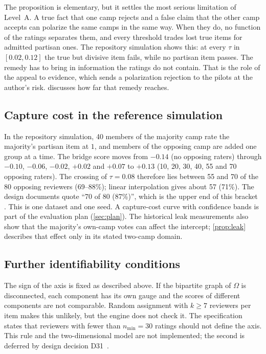 The proposition is elementary, but it settles the most serious limitation of Level~A. A true
fact that one camp rejects and a false claim that the other camp accepts can polarize the same
camps in the same way. When they do, no function of the ratings separates them, and every
threshold trades lost true items for admitted partisan ones. The repository simulation shows
this: at every $\tau$ in $[0.02,0.12]$ the true but divisive item fails, while no partisan item
passes. The remedy has to bring in information the ratings do not contain. That is the role of
the appeal to evidence, which sends a polarization rejection to the pilots at the author's risk.
 discusses how far that remedy reaches.

\subsection{Capture cost in the reference simulation}

In the repository simulation, 40 members of the majority camp rate the majority's partisan
item at $1$, and members of the opposing camp are added one group at a time. The bridge score
moves from $-0.14$ (no opposing raters) through $-0.10$, $-0.06$, $-0.02$, $+0.02$ and $+0.07$ to
$+0.13$ (10, 20, 30, 40, 55 and 70 opposing raters). The crossing of $\tau=0.08$ therefore lies
between 55 and 70 of the 80 opposing reviewers (69--88\%); linear interpolation gives about 57
(71\%). The design documents quote ``70 of 80 (87\%)'', which is the upper end of this bracket
\empirical. This is one dataset and one seed. A capture-cost curve with confidence bands is
part of the evaluation plan (\cref{sec:plan}). The historical leak measurements also show that the majority's own-camp votes can affect the
intercept; \cref{prop:leak} describes that effect only in its stated two-camp domain.

\subsection{Further identifiability conditions}

The sign of the axis is fixed as described above. If the bipartite graph of $\Omega$ is
disconnected, each component has its own gauge and the scores of different components are not
comparable. Random assignment with $k\ge7$ reviewers per item makes this unlikely, but the
engine does not check it. The specification states that reviewers with fewer than $n_{\min}=30$
ratings should not define the axis. This rule and the two-dimensional model are not
implemented; the second is deferred by design decision D31~\cite{isegoria-repo}.
